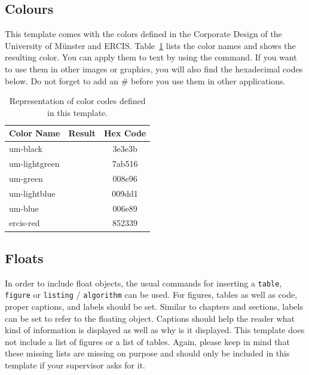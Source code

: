 \documentclass[
    language=english, %
    thesis=bachelor, %
    supervisor=postdoc, %
    multiauthor=false, %
    ]{settings/csssa-thesis}
\begin{document}
\subsection{Colours}\label{ch02:sec2:color}

This template comes with the colors defined in the Corporate Design of the University of Münster and ERCIS. Table~\ref{sec2:tab:colors} lists the color names and shows the resulting color. You can apply them to text by using the  command. If you want to use them in other images or graphics, you will also find the hexadecimal codes below. Do not forget to add an \# before you use them in other applications.

\begin{table}[H]
    \centering
    \caption{Representation of color codes defined in this template.}
    \label{sec2:tab:colors}
    \begin{tabular}{@{}lcc@{}}
        \toprule
        \textbf{Color Name} & \textbf{Result} & \textbf{Hex Code} \\ \midrule
            um-black     & \textcolor{um-black}{\blacksmiley{}} & 3e3e3b \\
            um-lightgreen  & \textcolor{um-lightgreen}{\blacksmiley{}} & 7ab516 \\
            um-green      & \textcolor{um-green}{\blacksmiley{}} & 008e96 \\
            um-lightblue      & \textcolor{um-lightblue}{\blacksmiley{}} & 009dd1 \\
            um-blue     & \textcolor{um-blue}{\blacksmiley{}} & 006e89 \\
            ercis-red      & \textcolor{ercis-red}{\blacksmiley{}} & 852339 \\
			\bottomrule
    \end{tabular}
\end{table}

\subsection{Floats}\label{ch02:sec3:floats}

In order to include float objects, the usual commands for inserting a   \texttt{table}, \texttt{figure} or \texttt{listing} / \texttt{algorithm} can be used. For figures, tables as well as code, proper captions, and labels should be set. Similar to chapters and sections, labels can be set to refer to the floating object. Captions should help the reader what kind of information is displayed as well as why is it displayed. This template does not include a list of figures or a list of tables. Again, please keep in mind that these missing lists are missing on purpose and should only be included in this template if your supervisor asks for it.
\end{document}

